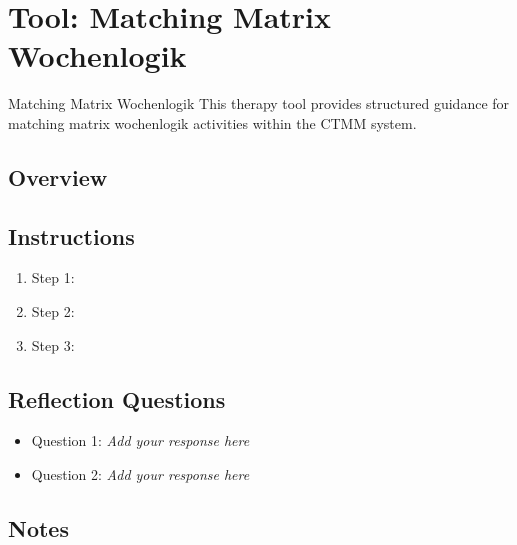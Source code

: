 
\section{Tool: Matching Matrix Wochenlogik}
\label{sec:tool-matching-matrix-wochenlogik}

\begin{ctmmBlueBox}{Matching Matrix Wochenlogik}
This therapy tool provides structured guidance for matching matrix wochenlogik activities within the CTMM system.
\end{ctmmBlueBox}

\subsection{Overview}

\subsection{Instructions}

\begin{enumerate}
\item Step 1: \checkbox~
\item Step 2: \checkbox~
\item Step 3: \checkbox~
\end{enumerate}

\subsection{Reflection Questions}

\begin{itemize}
\item Question 1: \textit{Add your response here}
\item Question 2: \textit{Add your response here}
\end{itemize}

\subsection{Notes}

\vspace{2cm}

